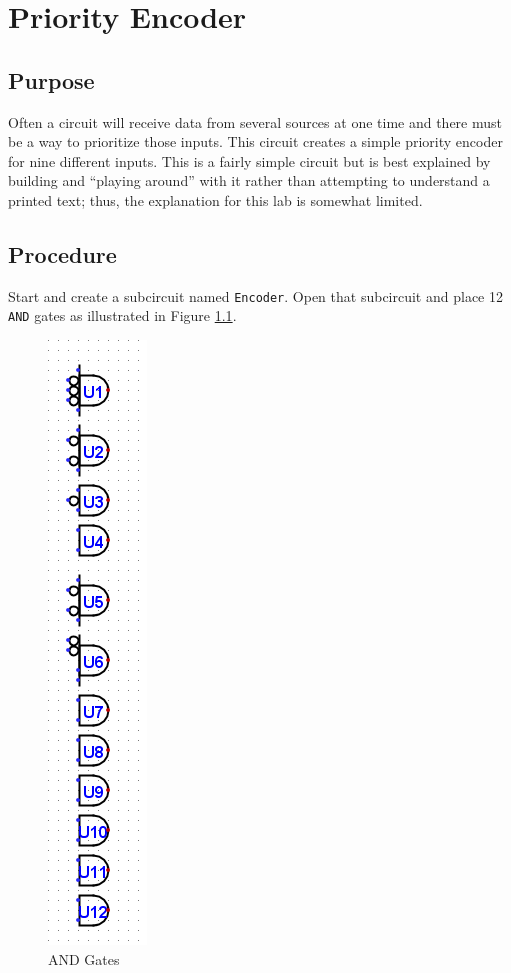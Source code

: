 \chapter{Priority Encoder}\label{encode}

\section{Purpose}

Often a circuit will receive data from several sources at one time and there must be a way to prioritize those inputs. This circuit creates a simple priority encoder for nine different inputs. This is a fairly simple circuit but is best explained by building and ``playing around'' with it rather than attempting to understand a printed text; thus, the explanation for this lab is somewhat limited.

\section{Procedure}

Start \LE and create a subcircuit named \lstinline[columns=fixed]|Encoder|. Open that subcircuit and place 12 \texttt{AND} gates as illustrated in Figure \ref{fig:encode-01}.

\begin{figure}[H]
	\centering
	\includegraphics[width=\maxwidth{.95\linewidth}]{gfx/encode-01}
	\caption{AND Gates}
	\label{fig:encode-01}
\end{figure}

